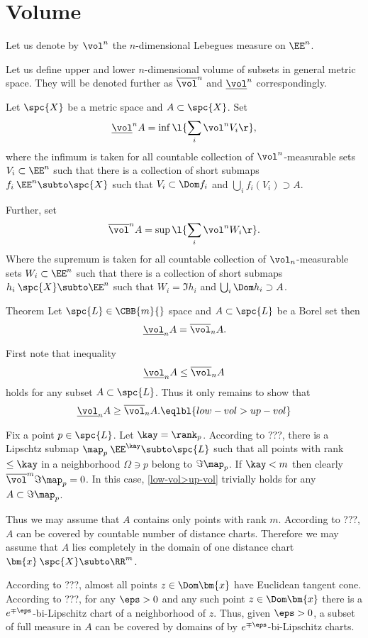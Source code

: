 \section{Volume}

Let us denote by $\vol^n$ the $n$-dimensional Lebegues measure on $\EE^n$.

Let us define upper and lower $n$-dimensional volume of subsets in general metric space.
They will be denoted further as $\overline\vol^n$ and $\underline\vol^n$ correspondingly.

Let $\spc{X}$ be a metric space and $A\subset \spc{X}$.
Set
\[\underline\vol^n A
=
\inf\l\{\sum_i\vol^n V_i\r\},\]
where the infimum is taken for all countable collection of $\vol^n$-measurable sets $V_i\subset \EE^n$
such that there is a collection of short submaps $f_i\:\EE^n\subto\spc{X}$
such that $V_i\subset\Dom f_i$ and $\bigcup_i f_i(V_i)\supset A$.

Further, set
\[\overline\vol^n A
=
\sup\l\{\sum_i\vol^n W_i\r\}.\]
Where the supremum is taken for all countable collection of $\vol_n$-measurable sets $W_i\subset \EE^n$
such that there is a collection of short submaps $h_i\:\spc{X}\subto\EE^n$
such that $W_i=\Im h_i$ and $\bigcup_i \Dom h_i\supset A$.

\begin{thm}{Theorem}
Let $\spc{L}\in\CBB{m}{}$ space and $A\subset\spc{L}$ be a Borel set then
\[\underline\vol_n A=\overline\vol_n A.\]

\end{thm}

First note that inequality
\[\underline\vol_n A\le\overline\vol_n A\]
holds for any subset $A\subset\spc{L}$.
Thus  it only remains to show that 
\[\underline\vol_n A\ge\overline\vol_n A.
\eqlbl{low-vol>up-vol}\]

Fix a point $p\in\spc{L}$.
Let $\kay=\rank_p$.
According to ???, there is a Lipschtz submap $\map_p\:\EE^\kay\subto\spc{L}$ such that all points with rank $\le\kay$ in a neighborhood $\Omega\ni p$ belong to $\Im\map_p$.
If $\kay<m$ then clearly $\overline\vol^m\Im\map_p=0$.
In this case, \ref{low-vol>up-vol} trivially holds for any $A\subset \Im\map_p$.

Thus we may assume that $A$ contains only points with rank $m$.
According to ???, $A$ can be covered by countable number of distance charts.
Therefore we may assume that $A$ lies completely in the domain of one distance chart $\bm{x}\:\spc{X}\subto\RR^m$.

According to ???,
almost all points $z\in\Dom\bm{x}$ have Euclidean tangent cone.
According to ???, for any $\eps>0$ and any such point $z\in \Dom\bm{x}$ there is a $e^{\mp\eps}$-bi-Lipschitz chart of a neighborhood of $z$.
Thus, given $\eps>0$,
a subset of full measure in $A$ 
can be covered by domains of by  $e^{\mp\eps}$-bi-Lipschitz charts.


